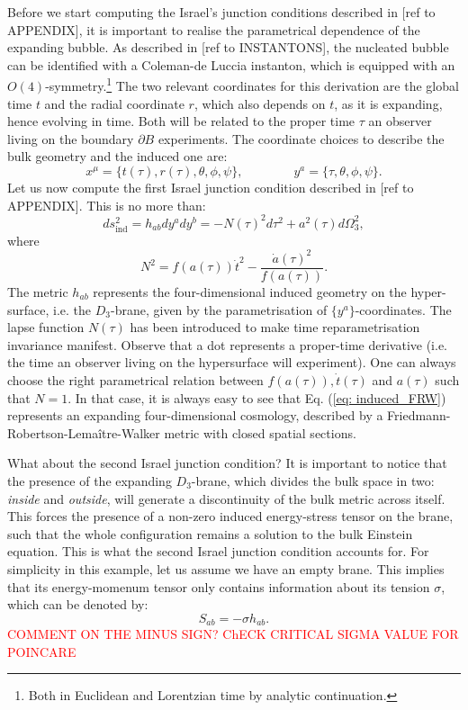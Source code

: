 \documentclass[12pt, a4paper]{article} %
\begin{document}
Before we start computing the Israel's junction conditions described in [ref to APPENDIX], it is important to realise the parametrical dependence of the expanding bubble. As described in [ref to INSTANTONS], the nucleated bubble can be identified with a Coleman-de Luccia instanton, which is equipped with an $O(4)$-symmetry.\footnote{Both in Euclidean and Lorentzian time by analytic continuation.} The two relevant coordinates for this derivation are the global time $t$ and the radial coordinate $r$, which also depends on $t$, as it is expanding, hence evolving in time. Both will be related to the proper time $\tau$ an observer living on the boundary $\partial B$ experiments. The coordinate choices to describe the bulk geometry and the induced one are:
\begin{equation}\label{eq: coordinates}
	x^{\mu} = \{t(\tau), r(\tau), \theta, \phi, \psi \}, \qquad \qquad  y^{a} = \{\tau, \theta, \phi, \psi\}.
\end{equation}
Let us now compute the first Israel junction condition described in [ref to APPENDIX]. This is no more than:
\begin{equation}\label{eq: induced_FRW}
	ds^{2}_{\text{ind}} = h_{ab} dy^{a} dy^{b} =  -N(\tau)^{2}d\tau^{2} + a^{2}(\tau) d\Omega_{3}^{2},
\end{equation}
where
\begin{equation}\label{eq: lapse_func}
	N^{2} = f(a(\tau)) \dot{t}^{2} - \frac{\dot{a}(\tau)^{2}}{f(a(\tau))}.
\end{equation}
The metric $h_{ab}$ represents the four-dimensional induced geometry on the hyper-surface, i.e. the $D_{3}$-brane, given by the parametrisation of $\{y^{a}\}$-coordinates. The lapse function $N(\tau)$ has been introduced to make time reparametrisation invariance manifest. Observe that a dot represents a proper-time derivative (i.e. the time an observer living on the hypersurface will experiment). One can always choose the right parametrical relation between $f(a(\tau)), \dot{t}(\tau)$ and $a(\tau)$ such that $N=1$. In that case, it is always easy to see that Eq. (\ref{eq: induced_FRW}) represents an expanding four-dimensional cosmology, described by a Friedmann-Robertson-Lemaître-Walker metric with closed spatial sections. 

What about the second Israel junction condition? It is important to notice that the presence of the expanding $D_{3}$-brane, which divides the bulk space in two: \textit{inside} and \textit{outside}, will generate a discontinuity of the bulk metric across itself. This forces the presence of a non-zero induced energy-stress tensor on the brane, such that the whole configuration remains a solution to the bulk Einstein equation. This is what the second Israel junction condition accounts for. For simplicity in this example, let us assume we have an empty brane. This implies that its energy-momenum tensor only contains information about its tension $\sigma$, which can be denoted by:
\begin{equation}\label{eq: simple_second_junc}
	S_{ab} = - \sigma h_{ab}.
\end{equation}
\textcolor{red}{COMMENT ON THE MINUS SIGN? ChECK CRITICAL SIGMA VALUE FOR POINCARE}
\end{document}
